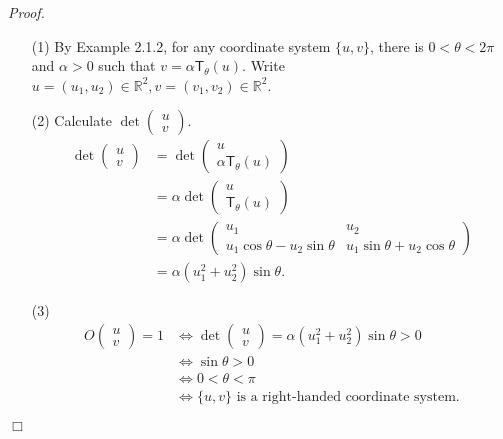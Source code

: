 \documentclass{article}
\begin{document}
\emph{Proof.}
\begin{enumerate}
\item[(1)]
By Example 2.1.2, for any coordinate system $\{ u, v \}$,
there is $0 < \theta < 2\pi$ and $\alpha > 0$ such that
$v = \alpha \mathsf{T}_{\theta}(u)$.
Write $u = (u_1, u_2) \in \mathbb{R}^2, v = (v_1, v_2) \in \mathbb{R}^2$.
\item[(2)]
Calculate $\det\begin{pmatrix} u \\ v \end{pmatrix}$.
\begin{align*}
\det\begin{pmatrix} u \\ v \end{pmatrix}
&= \det\begin{pmatrix} u \\ \alpha \mathsf{T}_{\theta}(u) \end{pmatrix} \\
&= \alpha \det\begin{pmatrix} u \\ \mathsf{T}_{\theta}(u) \end{pmatrix} \\
&= \alpha \det\begin{pmatrix}
  u_1 & u_2 \\
  u_1\cos\theta-u_2\sin\theta & u_1\sin\theta+u_2\cos\theta \end{pmatrix} \\
&= \alpha(u_1^2 + u_2^2) \sin\theta.
\end{align*}
\item[(3)]
\begin{align*}
O\begin{pmatrix} u \\ v \end{pmatrix} = 1
&\Longleftrightarrow
\det\begin{pmatrix} u \\ v \end{pmatrix} = \alpha(u_1^2 + u_2^2) \sin\theta > 0 \\
&\Longleftrightarrow
\sin\theta > 0 \\
&\Longleftrightarrow
0 < \theta < \pi \\
&\Longleftrightarrow
\{ u, v \} \text{ is a right-handed coordinate system}.
\end{align*}
\end{enumerate}
$\Box$ \\\\
\end{document}
